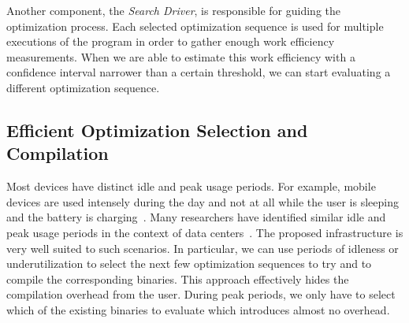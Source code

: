     Another component, the \textit{Search Driver}, is responsible for guiding the optimization process. Each selected optimization sequence
    is used for multiple executions of the program in order to gather enough work efficiency measurements. When we are able to
    estimate this work efficiency with a confidence interval narrower than a certain threshold, we can start evaluating a different
    optimization sequence. 

    \subsection{Efficient Optimization Selection and Compilation}

    Most devices have distinct idle and peak usage periods. For example, mobile devices are used intensely during the day and not at all while
    the user is sleeping and the battery is charging~\citep{mpeis16}. Many researchers have identified similar idle and peak usage periods in
    the context of data centers~\citep{armbrust10,chen12b}. The proposed \itercomp infrastructure is very well suited to such scenarios. In
    particular, we can use periods of idleness or underutilization to select the next few optimization sequences to try and to compile the
    corresponding binaries. This approach effectively hides the compilation overhead from the user. During peak periods, we only have to select
    which of the existing binaries to evaluate which introduces almost no overhead.
